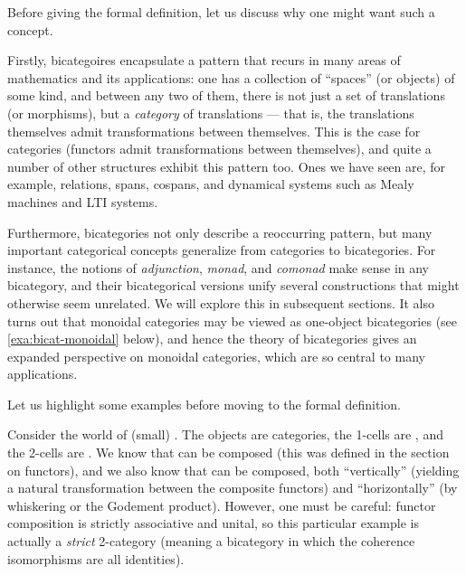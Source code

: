 Before giving the formal definition, let us discuss why one might want such a concept.

Firstly, bicategoires encapsulate a pattern that recurs in many areas of mathematics and its applications: one has a collection of ``spaces'' (or objects) of some kind, and between any two of them, there is not just a set of translations (or morphisms), but a \emph{category} of translations --- that is, the translations themselves admit transformations between themselves. This is the case for categories (functors admit transformations between themselves), and quite a number of other structures exhibit this pattern too. Ones we have seen are, for example, relations, spans, cospans, and dynamical systems such as Mealy machines and LTI systems.

Furthermore, bicategories not only describe a reoccurring pattern, but many important categorical concepts generalize from categories to bicategories.
For instance, the notions of \emph{adjunction}, \emph{monad}, and \emph{comonad} make sense in any bicategory, and their bicategorical versions unify several constructions that might otherwise seem unrelated. We will explore this in subsequent sections. It also turns out that monoidal categories may be viewed as one-object bicategories (see \cref{exa:bicat-monoidal} below), and hence the theory of bicategories gives an expanded perspective on monoidal categories, which are so central to many applications. 

Let us highlight some examples before moving to the formal definition. 

\begin{example}
    \label{exa:bicat-motivation-cat}
    Consider the world of (small) .
    The objects are categories, the 1-cells are , and the 2-cells are .
    We know that  can be composed (this was defined in the section on functors), and we also know that  can be composed, both ``vertically'' (yielding a natural transformation between the composite functors) and ``horizontally'' (by whiskering or the Godement product).
    However, one must be careful: functor composition is strictly associative and unital, so this particular example is actually a \emph{strict} 2-category (meaning a bicategory in which the coherence isomorphisms are all identities).
\end{example}

